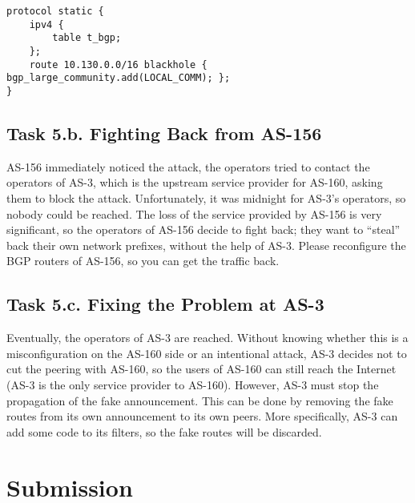 \begin{lstlisting}
protocol static {
    ipv4 {
        table t_bgp;
    };
    route 10.130.0.0/16 blackhole { bgp_large_community.add(LOCAL_COMM); };
}
\end{lstlisting}


\subsection{Task 5.b. Fighting Back from AS-156} 

AS-156 immediately noticed the attack, the operators tried to contact
the operators of AS-3, which is the upstream service provider for AS-160,
asking them to block the attack. Unfortunately, it was midnight for AS-3's
operators, so nobody could be reached. The loss of the service provided 
by AS-156 is very significant, so the operators of AS-156 decide to 
fight back; they want to ``steal'' back their own network prefixes, without the help
of AS-3. Please reconfigure the BGP routers of AS-156, so 
you can get the traffic back. 


\subsection{Task 5.c. Fixing the Problem at AS-3} 

Eventually, the operators of AS-3 are reached. Without knowing 
whether this is a misconfiguration on the AS-160 side or an intentional
attack, AS-3 decides not to cut the peering with AS-160, so the users 
of AS-160 can still reach the Internet (AS-3 is the only service 
provider to AS-160). However, AS-3 must stop the propagation of the 
fake announcement. This can be done by removing the 
fake routes from its own announcement to its own peers.
More specifically, AS-3 can add some code to its 
filters, so the fake routes will be discarded. 


\section{Submission}





